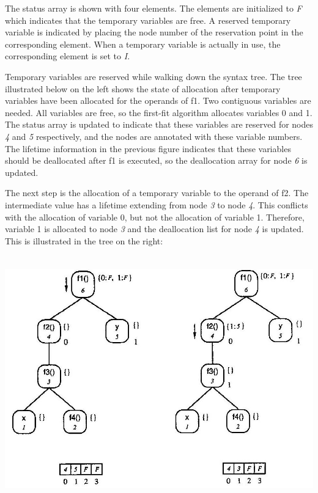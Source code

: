 The status array is shown with four elements. The elements are
initialized to \textit{F} which indicates that the temporary variables
are free. A reserved temporary variable is indicated by placing the
node number of the reservation point in the corresponding
element. When a temporary variable is actually in use, the
corresponding element is set to \textit{I}.

Temporary variables are reserved while walking down the syntax
tree. The tree illustrated below on the left shows the state of
allocation after temporary variables have been allocated for the
operands of f1. Two contiguous variables are needed. All variables are
free, so the first-fit algorithm allocates variables 0 and 1. The
status array is updated to indicate that these variables are reserved
for nodes \textit{4} and \textit{5} respectively, and the nodes are
annotated with these variable numbers. The lifetime information in the
previous figure indicates that these variables should be deallocated
after f1 is executed, so the deallocation array for node \textit{6} is
updated.

The next step is the allocation of a temporary variable to the operand
of f2. The intermediate value has a lifetime extending from node
\textit{3} to node \textit{4}. This conflicts with the allocation of
variable 0, but not the allocation of variable 1. Therefore, variable
1 is allocated to node \textit{3} and the deallocation list for node
\textit{4} is updated. This is illustrated in the tree on the right:

{\centering{}
\includegraphics[width=6.0in,height=4.2in]{kw/figure8-3.png}
\par}

